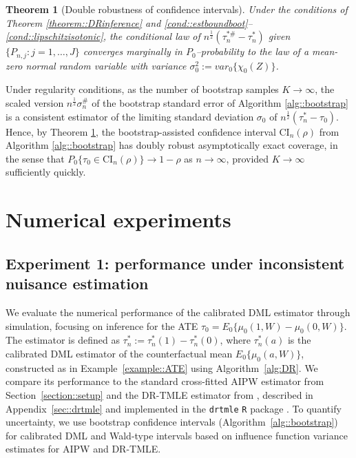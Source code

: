 \documentclass[11pt]{article}
\theoremstyle{plain}
\newtheorem{theorem}{Theorem}
\begin{document}
\begin{theorem}[Double robustness of confidence intervals]
\label{theorem::DRboot}
Under the conditions of Theorem \ref{theorem::DRinference} and \ref{cond::estboundboot}--\ref{cond::lipschitzisotonic}, the conditional law of $n^{\frac{1}{2}}(\tau_n^{*\#} - \tau_n^*)$ given $ \{P_{n,j}: j=1,\ldots,J\}$ converges marginally in $P_0$--probability to the law of a mean-zero normal random variable with variance $\sigma_0^2 := var_0\{\chi_0(Z)\}$.
\end{theorem}
Under regularity conditions, as the number of bootstrap samples $K \rightarrow \infty$, the scaled version $n^{\frac{1}{2}}\sigma_n^{\#}$ of the bootstrap standard error of Algorithm \ref{alg::bootstrap} is a consistent estimator of the limiting standard deviation $\sigma_0$ of $n^{\frac{1}{2}}(\tau_n^*-\tau_0)$. Hence, by Theorem \ref{theorem::DRboot}, the bootstrap-assisted confidence interval $\text{CI}_n(\rho)$ from Algorithm \ref{alg::bootstrap} has doubly robust asymptotically exact coverage, in the sense that $P_0\{\tau_0 \in \text{CI}_n(\rho)\} \rightarrow 1 - \rho$ as $n \rightarrow \infty$, provided $K \rightarrow \infty$ sufficiently quickly.


 



  
\section{Numerical experiments}
\label{section::experiments}

\subsection{Experiment 1: performance under inconsistent nuisance estimation}

\label{section::experiments1}
We evaluate the numerical performance of the calibrated DML estimator through simulation, focusing on inference for the ATE \( \tau_0 = E_0\{\mu_0(1,W) - \mu_0(0,W)\} \). The estimator is defined as \( \tau_n^* := \tau_n^*(1) - \tau_n^*(0) \), where \( \tau_n^*(a) \) is the calibrated DML estimator of the counterfactual mean \( E_0\{\mu_0(a,W)\} \), constructed as in Example~\ref{example::ATE} using Algorithm~\ref{alg:DR}. We compare its performance to the standard cross-fitted AIPW estimator from Section~\ref{section::setup} and the DR-TMLE estimator from \cite{benkeser2017doubly}, described in Appendix~\ref{sec::drtmle} and implemented in the \texttt{drtmle} \texttt{R} package \citep{benkeser2023doubly}. To quantify uncertainty, we use bootstrap confidence intervals (Algorithm~\ref{alg::bootstrap}) for calibrated DML and Wald-type intervals based on influence function variance estimates for AIPW and DR-TMLE.
\end{document}
